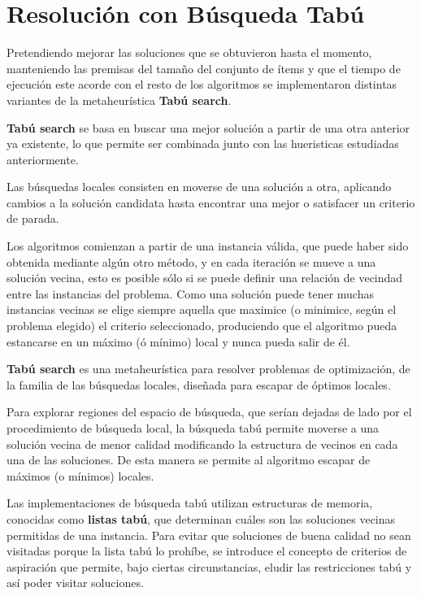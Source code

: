 \section{Resolución con Búsqueda Tabú}
Pretendiendo mejorar las soluciones que se obtuvieron hasta el momento, manteniendo las premisas del tamaño del conjunto de ítems y que el tiempo de ejecución este acorde con el resto de los algoritmos se implementaron distintas variantes de la metaheurística \textbf{Tabú search}. 

\textbf{Tabú search} se basa en buscar una mejor solución a partir de una otra anterior ya existente, lo que permite ser combinada junto con las hueristicas estudiadas anteriormente.

Las búsquedas locales consisten en moverse de una solución a otra, aplicando cambios a la solución candidata hasta encontrar una mejor o satisfacer un criterio de parada. 

Los algoritmos comienzan a partir de una instancia válida, que puede haber sido obtenida mediante algún otro método, y en cada iteración se mueve a una solución vecina, esto es posible sólo si se puede definir una relación de vecindad entre las instancias del problema. Como una solución puede tener muchas instancias vecinas se elige siempre aquella que maximice (o minimice, según el problema elegido) el criterio seleccionado, produciendo que el algoritmo pueda estancarse en un máximo (ó mínimo) local y nunca pueda salir de él.

\textbf{Tabú search}\cite{TS-1,TS-2} es una metaheurística para resolver problemas de optimización, de la familia de las búsquedas locales, diseñada para escapar de óptimos locales. 

Para explorar regiones del espacio de búsqueda, que serían dejadas de lado por el procedimiento de búsqueda local, la búsqueda tabú permite moverse a una solución vecina de menor calidad modificando la estructura de vecinos en cada una de las soluciones. De esta manera se permite al algoritmo escapar de máximos (o mínimos) locales.

Las implementaciones de búsqueda tabú utilizan estructuras de memoria, conocidas como \textbf{listas tabú}, que determinan cuáles son las soluciones vecinas permitidas de una instancia. Para evitar que soluciones de buena calidad no sean visitadas porque la lista tabú lo prohíbe, se introduce el concepto de criterios de aspiración que permite, bajo ciertas circunstancias, eludir las restricciones tabú y así poder visitar soluciones.

